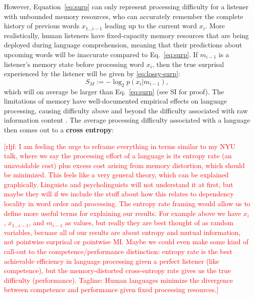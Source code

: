 \documentclass[12pt]{article}
\newcommand{\key}[1]{\textbf{#1}}
\newcommand{\rljf}[1]{\textcolor{Red}{[rljf: #1]}}
\begin{document}
However, Equation~\ref{eq:surp} can only represent processing difficulty for a listener with unbounded memory resources, who can accurately remember the complete history of previous words $x_{1...i-1}$ leading up to the current word $x_i$. More realistically, human listeners have fixed-capacity memory resources that are being deployed during language comprehension, meaning that their predictions about upcoming words will be inaccurate compared to Eq.~\ref{eq:surp}. If $m_{i-1}$ is a listener's memory state before processing word $x_i$, then the true surprisal experienced by the listener will be given by \ref{eq:lossy-surp}:
\begin{equation}
  \label{eq:lossy-surp}
  S_M := -\log_2 p(x_i|m_{i-1}),
\end{equation}
which will on average be larger than Eq.~\ref{eq:surp} (see SI for proof). The limitations of memory have well-documented empirical effects on language processing, causing difficulty above and beyond the difficulty associated with raw information content \cite{gibson1998linguistic,gibson1999memory,gibson2000dependency,vasishth2005activationbased,levy2013memory}.
The average processing difficulty associated with a language then comes out to a \key{cross entropy}:



\rljf{I am feeling the urge to reframe everything in terms similar to my NYU talk, where we say the processing effort of a language is its entropy rate (an unavoidable cost) plus excess cost arising from memory distortion, which should be minimized. This feels like a very general theory, which can be explained graphically. Linguists and psycholinguists will not understand it at first, but maybe they will if we include the stuff about how this relates to dependency locality in word order and processing. The entropy rate framing would allow us to define more useful terms for explaining our results. For example above we have $x_i$, $x_{1...i-1}$, and $m_{i-1}$ as values, but really they are best thought of as random variables, becuase all of our results are about entropy and mutual information, not pointwise surprisal or pointwise MI. Maybe we could even make some kind of call-out to the competence/performance distinction: entropy rate is the best achievable efficiency in language processing given a perfect listener (like competence), but the memory-distorted cross-entropy rate gives us the true difficulty (performance). Tagline: Human languages minimize the divergence between competence and performance given fixed processing resources.}
\end{document}
